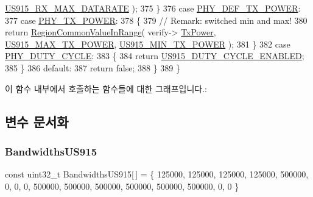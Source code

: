 \begin{DoxyCode}
      \mbox{\hyperlink{group___r_e_g_i_o_n_u_s915_ga01e1ec534d6632367f457fac9488a1a2}{US915\_RX\_MAX\_DATARATE}} );
375         \}
376         \textcolor{keywordflow}{case} \mbox{\hyperlink{group___r_e_g_i_o_n_gga51cbe8f5433d914fe9cf81b451de2c2da18ae0d314f20c212f9e40207099ab1bb}{PHY\_DEF\_TX\_POWER}}:
377         \textcolor{keywordflow}{case} \mbox{\hyperlink{group___r_e_g_i_o_n_gga51cbe8f5433d914fe9cf81b451de2c2da0dceb30b79f1bae301afd5406a86d6f3}{PHY\_TX\_POWER}}:
378         \{
379             \textcolor{comment}{// Remark: switched min and max!}
380             \textcolor{keywordflow}{return} \mbox{\hyperlink{group___r_e_g_i_o_n_c_o_m_m_o_n_gafdd1c80d953e18d755a631b72a9c3bd3}{RegionCommonValueInRange}}( verify->
      \mbox{\hyperlink{unionu_verify_params_a037b4f849fa8ed4aa1d3c58aef2b28ec}{TxPower}}, \mbox{\hyperlink{group___r_e_g_i_o_n_u_s915_gaa43b92e4e5cf26691dda96f7c4969c25}{US915\_MAX\_TX\_POWER}}, \mbox{\hyperlink{group___r_e_g_i_o_n_u_s915_ga7043556b6107cc2ca3f1275ee94dbb66}{US915\_MIN\_TX\_POWER}} );
381         \}
382         \textcolor{keywordflow}{case} \mbox{\hyperlink{group___r_e_g_i_o_n_gga51cbe8f5433d914fe9cf81b451de2c2dac66308571e624ecc28c79ee0deab8cf0}{PHY\_DUTY\_CYCLE}}:
383         \{
384             \textcolor{keywordflow}{return} \mbox{\hyperlink{group___r_e_g_i_o_n_u_s915_ga18f2e3af9cd1115d71597a3250f0e8ee}{US915\_DUTY\_CYCLE\_ENABLED}};
385         \}
386         \textcolor{keywordflow}{default}:
387             \textcolor{keywordflow}{return} \textcolor{keyword}{false};
388     \}
389 \}
\end{DoxyCode}
이 함수 내부에서 호출하는 함수들에 대한 그래프입니다.\+:


\subsection{변수 문서화}
\mbox{\label{group___r_e_g_i_o_n_u_s915_ga43866c304643f3a94e426a1a218ded00}} 
\subsubsection{\texorpdfstring{Bandwidths\+U\+S915}{BandwidthsUS915}}
{\footnotesize\ttfamily const uint32\+\_\+t Bandwidths\+U\+S915\mbox{[}$\,$\mbox{]} = \{ 125000, 125000, 125000, 125000, 500000, 0, 0, 0, 500000, 500000, 500000, 500000, 500000, 500000, 0, 0 \}\hspace{0.3cm}{\ttfamily [static]}}

